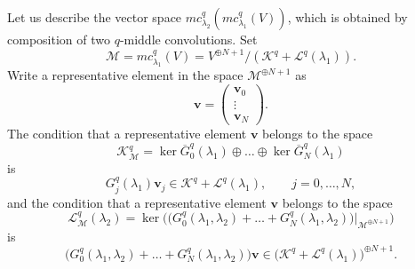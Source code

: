 \documentclass[pdftex]{sigma}
\numberwithin{equation}{section}
\theoremstyle{definition}
\begin{document}
Let us describe the vector space $mc ^{q} _{\lambda _2} (mc ^{q}_{\lambda _1} (V))$, which is obtained by composition of two $q$-middle convolutions.
Set
\[
 {\mathcal M } = mc ^{q} _{\lambda _1} (V) = V^{\oplus N+1}/( \mathcal{K}^{q} + \mathcal{L}^{q} (\lambda _1 ) ) .
 \]
Write a representative element  in the space ${\mathcal M } ^{\oplus N+1} $ as
\begin{equation*}
 \mathbf{v} = \begin{pmatrix} \mathbf{v}_{0} \\ \vdots \\ \mathbf{v}_{N} \end{pmatrix}.
\end{equation*}
The condition that a representative element $\mathbf{v} $ belongs to the space
\[
{\mathcal K }_{\mathcal M }^{q} = \operatorname{ker} \overline{G}_0^{q} (\lambda _1 ) \oplus \dots \oplus \operatorname{ker} \overline{G}_N^{q} (\lambda _1 )
\]
 is
\begin{equation}
 G_j^{q} (\lambda _1 ) \mathbf{v}_j \in \mathcal{K}^{q} + \mathcal{L}^{q} (\lambda _1 ) , \qquad j=0,\dots ,N , \label{eq:deftK}
\end{equation}
and the condition that a representative element $\mathbf{v}$ belongs to the space
\[
{\mathcal L }_{\mathcal M } ^{q} (\lambda _2 ) = \operatorname{ker} \bigl(\bigl(G_0^{q} (\lambda _1,\allowbreak \lambda _2 ) + \dots + G_N^{q} (\lambda _1, \lambda _2 )\bigr)|_{{\mathcal M } ^{\oplus N+1} }\bigr)
\]
 is
\begin{equation}
 \bigl( G_0^{q} (\lambda _1, \lambda _2 ) + \dots + G_N^{q} (\lambda _1, \lambda _2 )\bigr) \mathbf{v} \in \bigl(\mathcal{K}^{q} + \mathcal{L}^{q} (\lambda _1 )\bigr)^{\oplus N+1}.  \label{eq:deftL}
\end{equation}
\end{document}
